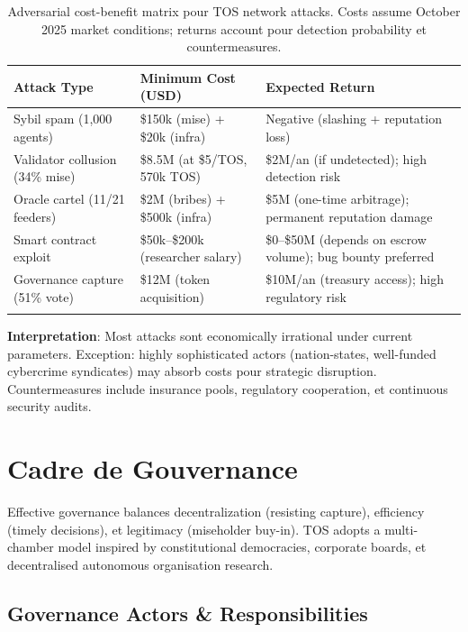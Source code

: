 \documentclass[11pt]{article}
\begin{document}
\begin{longtable}{@{}p{}p{}p{}@{}}
\toprule
\textbf{Attack Type} & \textbf{Minimum Cost (USD)} & \textbf{Expected Return} \\\midrule
Sybil spam (1,000 agents) & \$150k (mise) + \$20k (infra) & Negative (slashing + reputation loss) \\
Validator collusion (34\% mise) & \$8.5M (at \$5/TOS, 570k TOS) & \$2M/an (if undetected); high detection risk \\
Oracle cartel (11/21 feeders) & \$2M (bribes) + \$500k (infra) & \$5M (one-time arbitrage); permanent reputation damage \\
Smart contract exploit & \$50k--\$200k (researcher salary) & \$0--\$50M (depends on escrow volume); bug bounty preferred \\
Governance capture (51\% vote) & \$12M (token acquisition) & \$10M/an (treasury access); high regulatory risk \\
\bottomrule
\caption{Adversarial cost-benefit matrix pour TOS network attacks. Costs assume October 2025 market conditions; returns account pour detection probability et countermeasures.}
\end{longtable}

\textbf{Interpretation}: Most attacks sont economically irrational under current parameters. Exception: highly sophisticated actors (nation-states, well-funded cybercrime syndicates) may absorb costs pour strategic disruption. Countermeasures include insurance pools, regulatory cooperation, et continuous security audits.

\section{Cadre de Gouvernance}
\label{sec:governance}

Effective governance balances decentralization (resisting capture), efficiency (timely decisions), et legitimacy (miseholder buy-in). TOS adopts a multi-chamber model inspired by constitutional democracies, corporate boards, et decentralised autonomous organisation research.

\subsection{Governance Actors \& Responsibilities}
\end{document}
